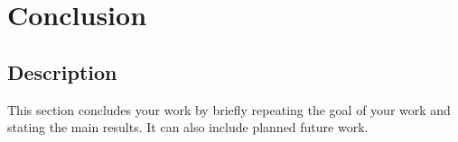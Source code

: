 \section{Conclusion}
\label{sec:conclusion}
\subsection{Description}
This section concludes your work by briefly repeating the
goal of your work and stating the main results. It can also
include planned future work.
